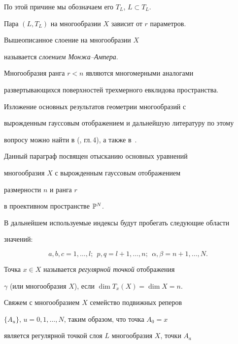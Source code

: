 По этой причине мы обозначаем его $T_L$, $L \subset T_L$.


Пара $(L, T_L)$ на многообразии $X$ зависит от $r$ параметров.



Вышеописанное слоение на многообразии $X$


называется {\em слоением Монжа--Ампера}.





Многообразия ранга $r < n$ являются многомерными аналогами


развертывающихся поверхностей трехмерного евклидова пространства.





Изложение основных результатов геометрии многообразий с


вырожденным гауссовым отображением и дальнейшую литературу по этому


вопросу можно найти в (\cite{AG93}, гл.\,4), а также в~\cite{AG04}.





Данный параграф посвящен отысканию основных уравнений


многообразия $X$ с вырожденным гауссовым отображением


размерности $n$ и ранга $r$


в проективном пространстве $\Bbb{P}^N$.





В дальнейшем используемые индексы будут пробегать следующие области


значений:


$$
a, b, c = 1, \dotsc, l; \ \ p, q = l + 1, \dotsc , n; \ \ \alpha,
\beta = n + 1, \dotsc , N.
$$





Точка $x \in X$ называется {\it регулярной точкой} отображения


$\gamma$ (или многообразия $X$), если $\dim T_x (X) = \dim X = n$.





Свяжем с многообразием $X$ семейство подвижных реперов


$\{A_u\}$, $u = 0, 1,\dotsc , N$, таким образом, что точка $A_0 = x$


является регулярной точкой слоя $L$ многообразия $X$, точки $A_a$


